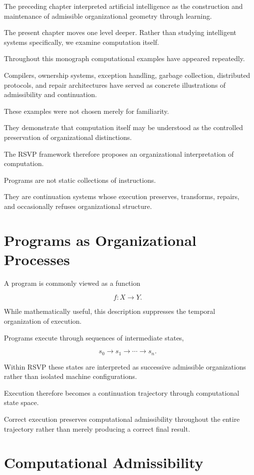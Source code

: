 \documentclass[11pt,oneside]{book}
\numberwithin{equation}{chapter}
\theoremstyle{definition}
\theoremstyle{plain}
\begin{document}
The preceding chapter interpreted artificial intelligence as the
construction and maintenance of admissible organizational geometry through
learning.

The present chapter moves one level deeper. Rather than studying
intelligent systems specifically, we examine computation itself.

Throughout this monograph computational examples have appeared repeatedly.

Compilers, ownership systems, exception handling, garbage collection,
distributed protocols, and repair architectures have served as concrete
illustrations of admissibility and continuation.

These examples were not chosen merely for familiarity.

They demonstrate that computation itself may be understood as the
controlled preservation of organizational distinctions.

The RSVP framework therefore proposes an organizational interpretation of
computation.

Programs are not static collections of instructions.

They are continuation systems whose execution preserves, transforms,
repairs, and occasionally refuses organizational structure.

\section{Programs as Organizational Processes}

A program is commonly viewed as a function

\[
f:X\rightarrow Y.
\]

While mathematically useful, this description suppresses the temporal
organization of execution.

Programs execute through sequences of intermediate states,

\[
s_0
\rightarrow
s_1
\rightarrow
\cdots
\rightarrow
s_n.
\]

Within RSVP these states are interpreted as successive admissible
organizations rather than isolated machine configurations.

Execution therefore becomes a continuation trajectory through computational
state space.

Correct execution preserves computational admissibility throughout the
entire trajectory rather than merely producing a correct final result.

\section{Computational Admissibility}
\end{document}

